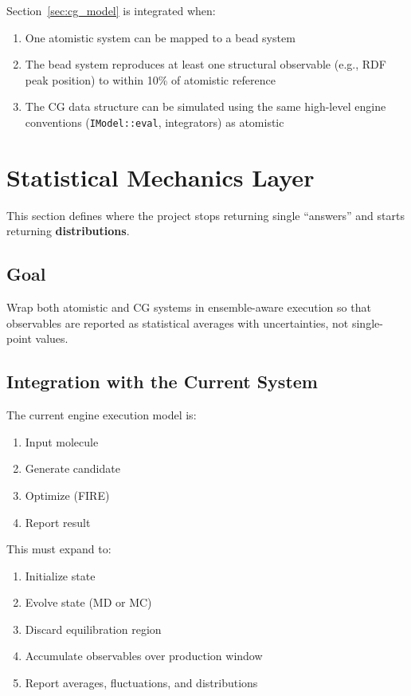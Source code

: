 \documentclass[11pt]{article}
\newcommand{\type}[1]{\texttt{#1}}
\begin{document}
Section~\ref{sec:cg_model} is integrated when:
\begin{enumerate}
  \item One atomistic system can be mapped to a bead system
  \item The bead system reproduces at least one structural observable
        (e.g., RDF peak position) to within 10\% of atomistic reference
  \item The CG data structure can be simulated using the same high-level
        engine conventions (\type{IModel::eval}, integrators) as atomistic
\end{enumerate}

\section{Statistical Mechanics Layer}
\label{sec:stat_mech}

This section defines where the project stops returning single ``answers''
and starts returning \textbf{distributions}.

\subsection{Goal}

Wrap both atomistic and CG systems in ensemble-aware execution so that
observables are reported as statistical averages with uncertainties, not
single-point values.

\subsection{Integration with the Current System}

The current engine execution model is:
\begin{enumerate}
  \item Input molecule
  \item Generate candidate
  \item Optimize (FIRE)
  \item Report result
\end{enumerate}

This must expand to:
\begin{enumerate}
  \item Initialize state
  \item Evolve state (MD or MC)
  \item Discard equilibration region
  \item Accumulate observables over production window
  \item Report averages, fluctuations, and distributions
\end{enumerate}
\end{document}
